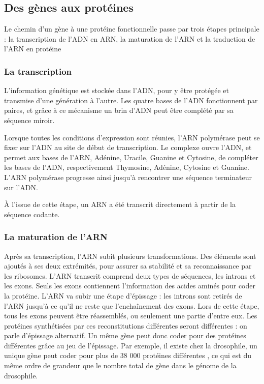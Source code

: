 \subsection{Des gènes aux protéines}

Le chemin d'un gène à une protéine fonctionnelle passe par trois étapes principale : la transcription de l'ADN en ARN, la maturation de l'ARN et la traduction de l'ARN en protéine 

\subsubsection{La transcription}

L'information génétique est stockée dans l'ADN, pour y être protégée et transmise d'une génération à l'autre. Les quatre bases de l'ADN fonctionnent par paires, et grâce à ce mécanisme un brin d'ADN peut être complété par sa séquence miroir. 

Lorsque toutes les conditions d'expression sont réunies, l'ARN polymérase peut se fixer sur l'ADN au site de début de transcription. Le complexe ouvre l'ADN, et permet aux bases de l'ARN, Adénine, Uracile, Guanine et Cytosine, de compléter les bases de l'ADN, respectivement Thymosine, Adénine, Cytosine et Guanine. L'ARN polymérase progresse ainsi jusqu'à rencontrer une séquence terminateur sur l'ADN. 

À l'issue de cette étape, un ARN a été transcrit directement à partir de la séquence codante. 

\subsubsection{La maturation de l'ARN}

Après sa transcription, l'ARN subit plusieurs transformations. Des éléments sont ajoutés à ses deux extrémités, pour assurer sa stabilité et sa reconnaissance par les ribosomes. 
L'ARN transcrit comprend deux types de séquences, les introns et les exons. Seuls les exons contiennent l'information des acides aminés pour coder la protéine. 
L'ARN va subir une étape d'épissage : les introns sont retirés de l'ARN jusqu'à ce qu'il ne reste que l'enchaînement des exons. Lors de cette étape, tous les exons peuvent être réassemblés, ou seulement une partie d'entre eux. Les protéines synthétisées par ces reconstitutions différentes seront différentes : on parle d'épissage alternatif. 
Un même gène peut donc coder pour des protéines différentes grâce au jeu de l'épissage. Par exemple, il existe chez la drosophile, un unique gène peut coder pour plus de 38 000 protéines différentes \cite{schmucker}, ce qui est du même ordre de grandeur que le nombre total de gène dans le génome de la drosophile. 

